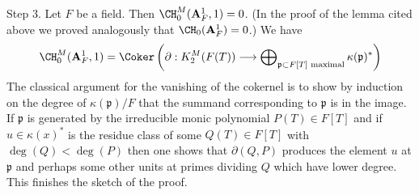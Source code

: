 \begin{remark}
\medskip\noindent
Step 3. Let $F$ be a field. Then $\CH^M_0(\mathbf{A}^1_F, 1) = 0$.
(In the proof of the lemma cited above we proved analogously that
$\CH_0(\mathbf{A}^1_F) = 0$.) We have
$$
\CH^M_0(\mathbf{A}^1_F, 1) = \Coker\left(
\partial : K^M_2(F(T)) \longrightarrow
\bigoplus\nolimits_{\mathfrak p \subset F[T]\text{ maximal}}
\kappa(\mathfrak p)^*\right)
$$
The classical argument for the vanishing of the cokernel is to
show by induction on the degree of $\kappa(\mathfrak p)/F$
that the summand corresponding to $\mathfrak p$ is in the image.
If $\mathfrak p$ is generated by the
irreducible monic polynomial $P(T) \in F[T]$ and if
$u \in \kappa(x)^*$ is the residue class of some
$Q(T) \in F[T]$ with $\deg(Q) < \deg(P)$ then one shows that
$\partial(Q, P)$ produces the element $u$ at $\mathfrak p$
and perhaps some other units at primes dividing $Q$ which
have lower degree. This finishes the sketch of the proof.
\end{remark}











